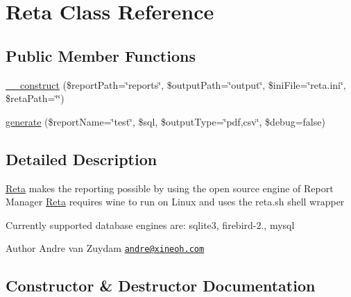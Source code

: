 \hypertarget{classReta}{}\section{Reta Class Reference}
\label{classReta}
\subsection*{Public Member Functions}
\begin{DoxyCompactItemize}
\item 
\hyperlink{classReta_a59ebb4d8111b19bcc2b646352035f88a}{\+\_\+\+\_\+construct} (\$report\+Path=\char`\"{}reports\char`\"{}, \$output\+Path=\char`\"{}output\char`\"{}, \$ini\+File=\char`\"{}reta.\+ini\char`\"{}, \$reta\+Path=\char`\"{}\char`\"{})
\item 
\hyperlink{classReta_a7e909b970b993508a9ff7a5361a58032}{generate} (\$report\+Name=\char`\"{}test\char`\"{}, \$sql, \$output\+Type=\char`\"{}pdf,csv\char`\"{}, \$debug=false)
\end{DoxyCompactItemize}


\subsection{Detailed Description}
\hyperlink{classReta}{Reta} makes the reporting possible by using the open source engine of Report Manager \hyperlink{classReta}{Reta} requires wine to run on Linux and uses the reta.\+sh shell wrapper

Currently supported database engines are\+: sqlite3, firebird-\/2., mysql

\begin{DoxyAuthor}{Author}
Andre van Zuydam \href{mailto:andre@xineoh.com}{\tt andre@xineoh.\+com} 
\end{DoxyAuthor}


\subsection{Constructor \& Destructor Documentation}
\hypertarget{classReta_a59ebb4d8111b19bcc2b646352035f88a}{}
